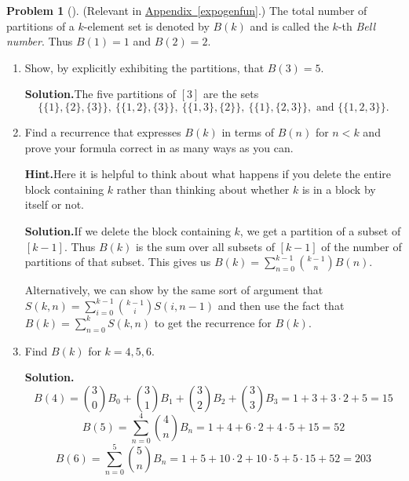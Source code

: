 \documentclass[10pt,]{book}
\theoremstyle{plain}
\theoremstyle{definition}
\newtheorem{activity}[project]{Problem}
\theoremstyle{definition}
\numberwithin{equation}{chapter}
\newcommand{\lt}{<}
\begin{document}
\begin{activity}[]\label{BellNumberIntro}
(Relevant in \hyperref[expogenfun]{Appendix~\ref{expogenfun}}.) The total number of partitions of a \(k\)-element set is denoted by \(B(k)\) and is called the \(k\)-th \emph{Bell number}. Thus \(B(1)=1\) and \(B(2) =2\).%
\begin{enumerate}[font=\bfseries,label=(\alph*),ref=\alph*]
\item\label{task-104} Show, by explicitly exhibiting the partitions, that \(B(3)=5\).%
\par\medskip\noindent%
\textbf{Solution.}\quad The five partitions of \([3]\) are the sets%
\begin{equation*}
\{\{1\},
\{2\},\{3\}\},\ 
\{\{1,2\},\{3\}\},\ \{\{1,3\},\{2\}\},\ \{\{1\},\{2,3\}\},\text{ and }
\{\{1,2,3\}\}\text{.}
\end{equation*}
%
\item\label{task-105} Find a recurrence that expresses \(B(k)\) in terms of \(B(n)\) for \(n\lt  k\) and prove your formula correct in as many ways as you can.%
\par\medskip\noindent%
\textbf{Hint.}\quad Here it is helpful to think about what happens if you delete the entire block containing \(k\) rather than thinking about whether \(k\) is in a block by itself or not.%
\par\medskip\noindent%
\textbf{Solution.}\quad If we delete the block containing \(k\), we get a partition of a subset of \([k-1]\). Thus \(B(k)\) is the sum over all subsets of \([k-1]\) of the number of partitions of that subset. This gives us \(B(k)= \sum_{n=0}^{k-1}\binom{k-1}{n}B(n)\).%
\par
Alternatively, we can show by the same sort of argument that \(S(k,n)=\sum_{i=0}^{k-1} \binom{k-1}{i}S(i,n-1)\) and then use the fact that \(B(k)=\sum_{n=0}^k S(k,n)\) to get the recurrence for \(B(k)\).%
\item\label{task-106} Find \(B(k)\) for \(k=4,5,6\).%
\par\medskip\noindent%
\textbf{Solution.}\quad %
\begin{equation*}
B(4) =\binom{3}{0}B_0 +\binom{3}{1}B_1 +\binom{3}{2}B_2 +
\binom{3}{3}B_3=1 +3+3\cdot2 +5=15
\end{equation*}
%
\begin{equation*}
B(5) = \sum_{n=0}^4 \binom{4}{n}B_n = 1 +4+6\cdot2 +4\cdot5 + 15=52
\end{equation*}
%
\begin{equation*}
B(6) = \sum_{n=0}^5 \binom{5}{n}B_n =1+5 +10\cdot2 +10\cdot 5
+5\cdot 15 +52=203
\end{equation*}
%
\end{enumerate}
\end{activity}
\typeout{************************************************}
\typeout{************************************************}
\end{document}
